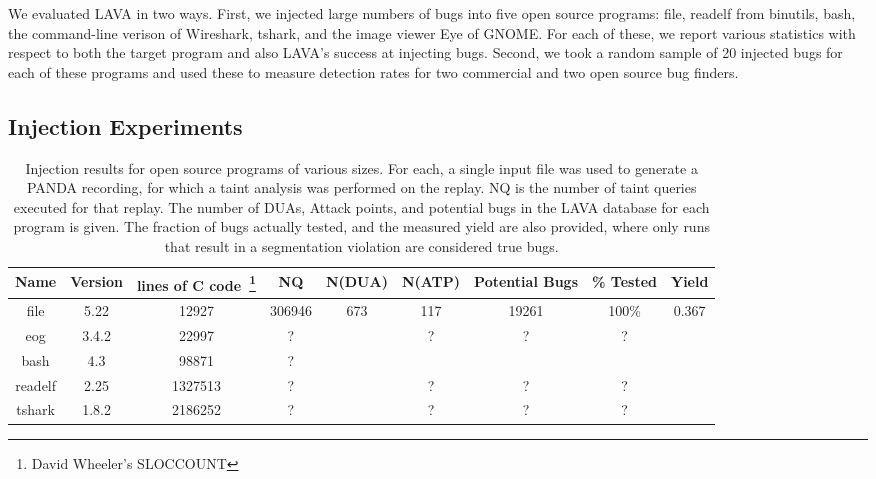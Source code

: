 
\label{section:results}

We evaluated LAVA in two ways.
First, we injected large numbers of bugs into five open source programs: file, readelf from binutils, bash, the command-line verison of Wireshark, tshark, and the image viewer Eye of GNOME.
For each of these, we report various statistics with respect to both the target program and also LAVA's success at injecting bugs. 
Second, we took a random sample of 20 injected bugs for each of these programs and used these to measure detection rates for two commercial and two open source bug finders.

\subsection{Injection Experiments}


\begin{table*}[t]
\centering
\begin{tabular}{c|c|c|c|c|c|c|c|c} 
Name    & Version & lines of C code~\footnote{David Wheeler's SLOCCOUNT} & NQ      &  N(DUA) & N(ATP) & Potential Bugs & \% Tested & Yield \\ \hline
file    & 5.22    & 12927           & 306946  & 673     & 117    & 19261          & 100\%     & 0.367  \\
eog     & 3.4.2   & 22997           & ?       &         & ?      & ?              & ?         &  \\
bash    & 4.3     & 98871           & ?       &         &        &                &           &  \\
readelf & 2.25    & 1327513         & ?       &         & ?      & ?              & ?         &  \\
tshark  & 1.8.2   & 2186252         & ?       &         & ?      & ?              & ?         &  \\
\end{tabular}
\caption{Injection results for open source programs of various sizes.
For each, a single input file was used to generate a PANDA recording, for which a taint analysis was performed on the replay.
NQ is the number of taint queries executed for that replay.
The number of DUAs, Attack points, and potential bugs in the LAVA database for each program is given.
The fraction of bugs actually tested, and the measured yield are also provided, where only runs that result in a segmentation violation are considered true bugs.
}
\end{table*}


